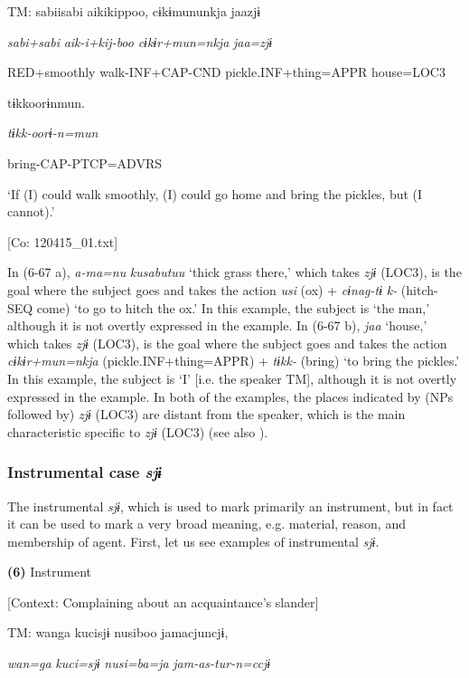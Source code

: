     TM:  sabiisabi  aikikippoo,  cɨkɨmununkja  jaazjɨ

      \textit{sabi+sabi}  \textit{aik-i+kij-boo}  \textit{cɨkɨr+mun=nkja}  \textit{jaa=zjɨ}

      RED+smoothly  walk-INF+CAP-CND  pickle.INF+thing=APPR  house=LOC3

      tɨkkoorɨnmun.

      \textit{tɨkk-oorɨ-n=mun}

      bring-CAP-PTCP=ADVRS

      ‘If (I) could walk smoothly, (I) could go home and bring the pickles, but (I cannot).’

      [Co: 120415\_01.txt]

In (6-67 a), \textit{a-ma=nu} \textit{kusabutuu} ‘thick grass there,’ which takes \textit{zjɨ} (LOC3), is the goal where the subject goes and takes the action \textit{usi} (ox) + \textit{cɨnag-tɨ} \textit{k-} (hitch-SEQ come) ‘to go to hitch the ox.’ In this example, the subject is ‘the man,’ although it is not overtly expressed in the example. In (6-67 b), \textit{jaa} ‘house,’ which takes \textit{zjɨ} (LOC3), is the goal where the subject goes and takes the action \textit{cɨkɨr+mun=nkja} (pickle.INF+thing=APPR) + \textit{tɨkk-} (bring) ‘to bring the pickles.’ In this example, the subject is ‘I’ [i.e. the speaker TM], although it is not overtly expressed in the example. In both of the examples, the places indicated by (NPs followed by) \textit{zjɨ} (LOC3) are distant from the speaker, which is the main characteristic specific to \textit{zjɨ} (LOC3) (see also ).

\subsubsection{Instrumental case \textit{sjɨ}}

The instrumental \textit{sjɨ}, which is used to mark primarily an instrument, but in fact it can be used to mark a very broad meaning, e.g. material, reason, and membership of agent. First, let us see examples of instrumental \textit{sjɨ}.

\textbf{(6)}  Instrument

  [Context: Complaining about an acquaintance’s slander]

  TM:  wanga  kucisjɨ  nusiboo  jamacjuncjɨ,

    \textit{wan=ga}  \textit{kuci=sjɨ}  \textit{nusi=ba=ja}  \textit{jam-as-tur-n=ccjɨ}

